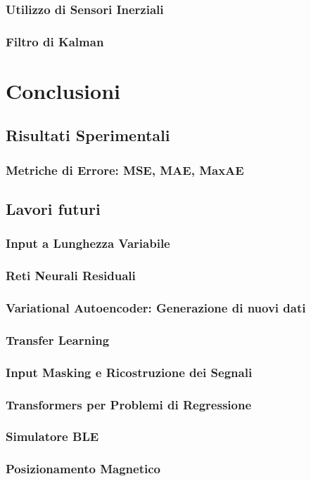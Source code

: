 \documentclass[12pt]{report}
\begin{document}
\subsection{Utilizzo di Sensori Inerziali}
\subsection{Filtro di Kalman}

\chapter{Conclusioni}
\section{Risultati Sperimentali}
\subsection{Metriche di Errore: MSE, MAE, MaxAE}

\section{Lavori futuri}
\subsection{Input a Lunghezza Variabile}
\subsection{Reti Neurali Residuali}
\subsection{Variational Autoencoder: Generazione di nuovi dati}
\subsection{Transfer Learning}
\subsection{Input Masking e Ricostruzione dei Segnali}
\subsection{Transformers per Problemi di Regressione}
\subsection{Simulatore BLE}
\subsection{Posizionamento Magnetico}

\appendix

\printbibliography
\end{document}
